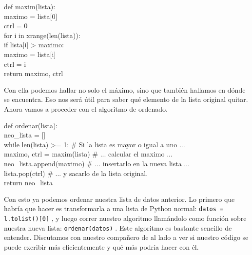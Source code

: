 \documentclass[10pt,letterpaper]{article}
\newcommand{\inlinecode}[1]{
\colorbox{light-gray}{\texttt{#1}}
}
\newenvironment{Code}
{
\begin{lrbox}{\selvestebox}%
\begin{minipage}{\dimexpr\columnwidth-2\fboxsep\relax}
\fontfamily{\ttdefault}\selectfont
}
{\end{minipage}\end{lrbox}%
\begin{center}
\colorbox{light-gray}{\usebox{\selvestebox}}
\end{center}
}
\begin{document}
\begin{footnotesize}
\begin{Code}
def maxim(lista):\\
\hspace*{5mm} maximo = lista[0]\\
\hspace*{5mm} ctrl = 0\\
\hspace*{5mm} for i in xrange(len(lista)):\\
\hspace*{11mm} if lista[i] > maximo:\\
\hspace*{17mm} maximo = lista[i]\\
\hspace*{17mm} ctrl = i\\
\hspace*{5mm} return maximo, ctrl
\end{Code}
\end{footnotesize}

\noindent Con ella podemos hallar no solo el m\'aximo, sino que tambi\'en hallamos en d\'onde se encuentra. Eso nos ser\'a \'util para saber qu\'e elemento de la lista original quitar. Ahora vamos a proceder con el algoritmo de ordenado.

\begin{footnotesize}
\begin{Code}
def ordenar(lista):\\
\hspace*{5mm} neo\_lista = []\\
\hspace*{5mm} while len(lista) >= 1: \# Si la lista es mayor o igual a uno ...\\
\hspace*{11mm} maximo, ctrl = maxim(lista) \# ... calcular el maximo ...\\
\hspace*{11mm} neo\_lista.append(maximo) \# ... insertarlo en la nueva lista ...\\
\hspace*{11mm} lista.pop(ctrl) \# ... y sacarlo de la lista original.\\
\hspace*{5mm} return neo\_lista
\end{Code}
\end{footnotesize}

\noindent Con esto ya podemos ordenar nuestra lista de datos anterior. Lo primero que habr\'ia que hacer es transformarla a una lista de Python normal: \inlinecode{datos = l.tolist()[0]}, y luego correr nuestro algoritmo llam\'andolo como funci\'on sobre nuestra nueva lista: \inlinecode{ordenar(datos)}. Este algoritmo es bastante sencillo de entender. Discutamos con nuestro compa\~nero de al lado a ver si nuestro c\'odigo se puede excribir m\'as eficientemente y qu\'e m\'as podr\'ia hacer con \'el.\\
\end{document}
